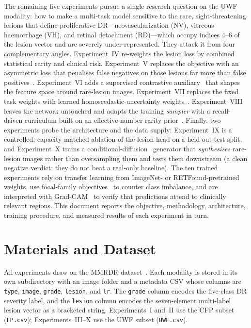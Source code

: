 \documentclass[journal,twoside,web]{ieeecolor}
\begin{document}
The remaining five experiments pursue a single research question on the UWF
modality: how to make a multi-task model sensitive to the rare, sight-threatening
lesions that define proliferative DR---neovascularization (NV), vitreous
haemorrhage (VH), and retinal detachment (RD)---which occupy indices $4$--$6$ of
the lesion vector and are severely under-represented. They attack it from four
complementary angles. Experiment~IV re-weights the lesion loss by combined
statistical rarity and clinical risk. Experiment~V replaces the objective with an
asymmetric loss that penalises false negatives on those lesions far more than false
positives~\cite{asl}. Experiment~VI adds a supervised contrastive
auxiliary~\cite{supcon} that shapes the feature space around rare-lesion images.
Experiment~VII replaces the fixed task weights with learned homoscedastic-uncertainty
weights~\cite{uncertainty}. Experiment~VIII leaves the network untouched and adapts
the training \emph{sampler} with a recall-driven curriculum built on an
effective-number rarity prior~\cite{effnum}. Finally, two experiments probe the
architecture and the data supply: Experiment~IX is a controlled, capacity-matched
ablation of the lesion head on a held-out test split, and Experiment~X trains a
conditional-diffusion~\cite{ddpm} generator that \emph{synthesises} rare-lesion
images rather than oversampling them and tests them downstream (a clean negative
verdict: they do not beat a real-only baseline). The ten trained experiments rely on transfer learning from
ImageNet- or RETFound-pretrained weights, use focal-family objectives~\cite{focalloss}
to counter class imbalance, and are interpreted with Grad-CAM~\cite{gradcam} to
verify that predictions attend to clinically relevant regions. This document reports
the objective, methodology, architecture, training procedure, and measured results
of each experiment in turn.

\section{Materials and Dataset}
\label{sec:materials}
All experiments draw on the MMRDR dataset~\cite{mmrdr}. Each modality is stored
in its own subdirectory with an image folder and a metadata CSV whose columns
are \texttt{type}, \texttt{image}, \texttt{grade}, \texttt{lesion}, and
\texttt{lr}. The \texttt{grade} column encodes the five-class DR severity label,
and the \texttt{lesion} column encodes the seven-element multi-label lesion
vector as a bracketed string. Experiments~I and~II use the CFP subset
(\texttt{FP.csv}); Experiments~III--X use the UWF subset (\texttt{UWF.csv}).
\end{document}
